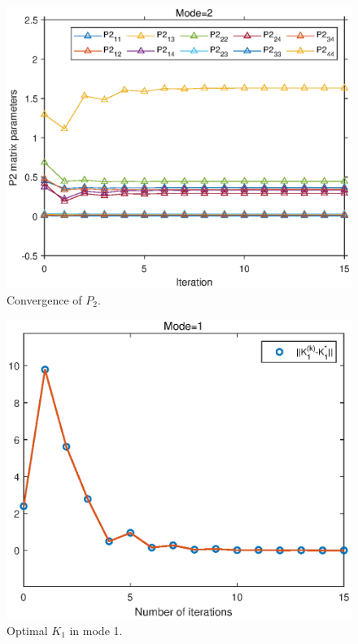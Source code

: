 \documentclass[journal]{IEEEtran}
\begin{document}
\begin{figure}%
	\centering
	\includegraphics[scale=0.6]{elementP2mode2.eps}
	\caption{Convergence of $P_{2}$.}
	\label{fig:6}
\end{figure}

\begin{figure} %
	\centering
	\includegraphics[scale=0.6]{optk1mode1.eps}
	\caption{Optimal $K_{1}$ in mode 1.}
	\label{fig:7}
\end{figure}
\end{document}
